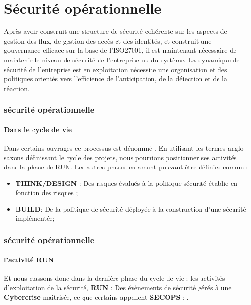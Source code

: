 %
%


\section{Sécurité opérationnelle}

Après avoir construit une structure de sécurité cohérente sur les aspects de gestion des flux, de gestion des accès et des identités, et construit une gouvernance efficace sur la base de l'ISO27001, il est maintenant nécessaire de maintenir le niveau de sécurité de l'entreprise ou du système. La dynamique de sécurité de l'entreprise est en exploitation nécessite une organisation et des politiques orientés vers l'efficience de l'anticipation, de la détection et de la réaction.

\begin{frame}
\frametitle<presentation>{sécurité opérationnelle}
\framesubtitle<presentation>{Dans le cycle de vie}
Dans certains ouvrages ce processus est dénommé  . En utilisant  les termes anglo-saxons définissant le cycle des projets, nous pourrions positionner ses activités dans la phase de  RUN. Les autres phases en amont pouvant être définies comme : 

\begin{itemize}
 \item \textbf{THINK/DESIGN} : Des risques évalués à la politique sécurité établie en fonction des risques ;
 \item \textbf{BUILD}: De la politique de sécurité déployée à la construction d’une sécurité implémentée;
\end{itemize}
\end{frame}


\begin{frame}
\frametitle<presentation>{sécurité opérationnelle}
\framesubtitle<presentation>{l'activité RUN}

Et nous classons donc dans la dernière phase du cycle de vie : les activités d'exploitation de la sécurité, \textbf{RUN} : Des évènements de sécurité gérés à une \textbf{Cybercrise} maitrisée, ce que certains appellent \textbf{SECOPS} : .
\end{frame}


